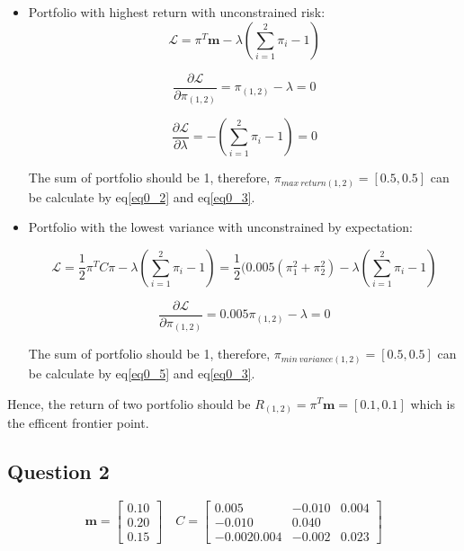 \documentclass[sigconf]{acmart}
\begin{document}
\begin{itemize}
\item Portfolio with highest return with unconstrained risk:
\begin{equation} \label{eq0_1}
\mathcal{L} = \pi^{T}\bm{m} - \lambda(\sum_{i=1}^{2}\pi_{i}-1)
\end{equation}

\begin{equation} \label{eq0_2}
\frac{\partial \mathcal{L}}{\partial \pi_{(1,2)}} = \pi_{(1,2)} - \lambda = 0
\end{equation}

\begin{equation} \label{eq0_3}
\frac{\partial \mathcal{L}}{\partial \lambda} = -(\sum_{i=1}^{2}\pi_{i}-1) = 0
\end{equation}

The sum of portfolio should be 1, therefore, $\pi_{max\ return(1,2)} = [0.5,0.5]$ can be calculate by eq\eqref{eq0_2} and eq\eqref{eq0_3}. ~\\

\item Portfolio with the lowest variance with unconstrained by expectation:

\begin{equation} \label{eq0_4}
\mathcal{L} = \frac{1}{2}\pi^{T}C\pi - \lambda(\sum_{i=1}^{2}\pi_{i}-1) = \frac{1}{2}(0.005(\pi_{1}^{2}+\pi_{2}^{2}) - \lambda(\sum_{i=1}^{2}\pi_{i}-1)
\end{equation}

\begin{equation} \label{eq0_5}
\frac{\partial \mathcal{L}}{\partial \pi_{(1,2)}} = 0.005\pi_{(1,2)} - \lambda = 0
\end{equation}

The sum of portfolio should be 1, therefore, $\pi_{min\ variance(1,2)} = [0.5,0.5]$ can be calculate by eq\eqref{eq0_5} and eq\eqref{eq0_3}. ~\\

\end{itemize}

Hence, the return of two portfolio should be $R_{(1,2)} = \pi^{T}\bm{m} = [0.1,0.1]$ which is the efficent frontier point.

\subsection{Question 2}

\[
\bm{m}=\begin{bmatrix}
0.10\\ 
0.20\\ 
0.15
\end{bmatrix} \quad
C = \begin{bmatrix}
 0.005 & -0.010 & 0.004\\ 
 -0.010& 0.040 & \\ -0.002
 0.004& -0.002 & 0.023
\end{bmatrix}
\]
\end{document}
